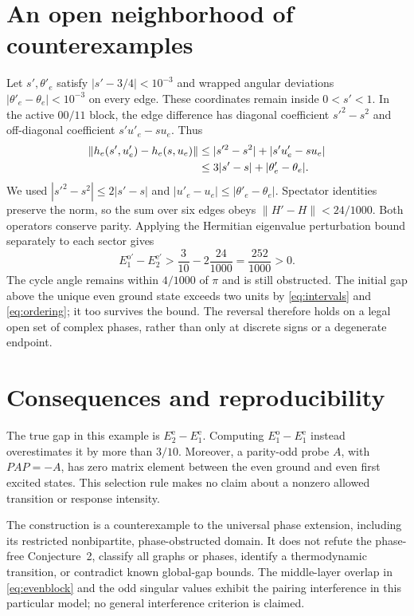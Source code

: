 \documentclass[11pt]{article}
\newcommand{\Ee}{E^{\mathrm e}}
\newcommand{\Eo}{E^{\mathrm o}}
\begin{document}
\section{An open neighborhood of counterexamples}
Let $s',\theta'_e$ satisfy $|s'-3/4|<10^{-3}$ and wrapped angular deviations $|\theta'_e-\theta_e|<10^{-3}$ on every edge. These coordinates remain inside $0<s'<1$. In the active $00/11$ block, the edge difference has diagonal coefficient $s'^2-s^2$ and off-diagonal coefficient $s'u'_e-su_e$. Thus
\begin{align}
 \|h_e(s',u'_e)-h_e(s,u_e)\|
 &\le |s'^2-s^2|+|s'u'_e-su_e|\notag\\
 &\le 3|s'-s|+|\theta'_e-\theta_e|.
\end{align}
We used $|s'^2-s^2|\le2|s'-s|$ and $|u'_e-u_e|\le|\theta'_e-\theta_e|$. Spectator identities preserve the norm, so the sum over six edges obeys $\|H'-H\|<24/1000$. Both operators conserve parity. Applying the Hermitian eigenvalue perturbation bound separately to each sector gives
\begin{equation}
 E^{\mathrm o\prime}_1-E^{\mathrm e\prime}_2>\frac3{10}-2\frac{24}{1000}=\frac{252}{1000}>0.
\end{equation}
The cycle angle remains within $4/1000$ of $\pi$ and is still obstructed. The initial gap above the unique even ground state exceeds two units by \eqref{eq:intervals} and \eqref{eq:ordering}; it too survives the bound. The reversal therefore holds on a legal open set of complex phases, rather than only at discrete signs or a degenerate endpoint.

\section{Consequences and reproducibility}
The true gap in this example is $\Ee_2-\Ee_1$. Computing $\Eo_1-\Ee_1$ instead overestimates it by more than $3/10$. Moreover, a parity-odd probe $A$, with $PAP=-A$, has zero matrix element between the even ground and even first excited states. This selection rule makes no claim about a nonzero allowed transition or response intensity.

The construction is a counterexample to the universal phase extension, including its restricted nonbipartite, phase-obstructed domain. It does not refute the phase-free Conjecture~2, classify all graphs or phases, identify a thermodynamic transition, or contradict known global-gap bounds. The middle-layer overlap in \eqref{eq:evenblock} and the odd singular values exhibit the pairing interference in this particular model; no general interference criterion is claimed.
\end{document}

